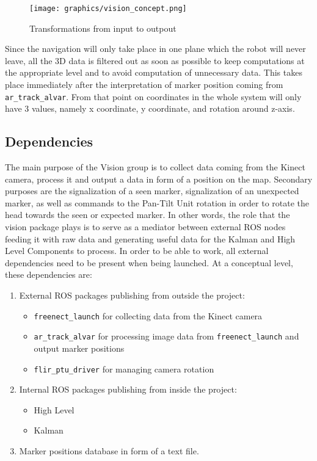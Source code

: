 \begin{figure}[h]
\begin{center}
\texttt{[image: graphics/vision\_concept.png]}
\caption{Transformations from input to outpout}
\label{Vision Concept}
\end{center}
\end{figure}

Since the navigation will only take place in one plane which the robot will never leave, all the 3D data is filtered out as soon as possible to keep computations at the appropriate level and to avoid computation of unnecessary data. This takes place immediately after the interpretation of marker position coming from \texttt{ar\_track\_alvar}. From that point on coordinates in the whole system will only have 3 values, namely x coordinate, y coordinate, and rotation around z-axis. 

\subsection{Dependencies}
The main purpose of the Vision group is to collect data coming from the Kinect camera, process it and output a data in form of a position on the map. Secondary purposes are the signalization of a seen marker, signalization of an unexpected marker, as well as commands to the Pan-Tilt Unit rotation in order to rotate the head towards the seen or expected marker. In other words, the role that the vision package plays is to serve as a mediator between external ROS nodes feeding it with raw data and generating useful data for the Kalman and High Level Components to process. In order to be able to work, all external dependencies need to be present when being launched. At a conceptual level, these dependencies are:

\begin{enumerate}
\item External ROS packages publishing from outside the project:
\begin{itemize}
\item \texttt{freenect\_launch} for collecting data from the Kinect camera
\item \texttt{ar\_track\_alvar} for processing image data from \texttt{freenect\_launch} and output marker positions
\item \texttt{flir\_ptu\_driver} for managing camera rotation
\end{itemize}
\item Internal ROS packages publishing from inside the project: 
\begin{itemize}
\item High Level
\item Kalman
\end{itemize}
\item Marker positions database in form of a text file.
\end{enumerate}

